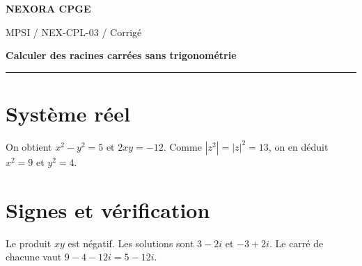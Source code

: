 \documentclass[11pt,a4paper]{article}
\begin{document}
{\small\bfseries\color{nexorablue} NEXORA CPGE}\par
{\small MPSI / NEX-CPL-03 / Corrigé}\par
{\LARGE\bfseries Calculer des racines carrées sans trigonométrie}\par
\vspace{0.25em}\hrule\vspace{0.6em}

\section*{Système réel}
On obtient $x^2-y^2=5$ et $2xy=-12$. Comme $|z^2|=|z|^2=13$, on en déduit $x^2=9$ et $y^2=4$.

\section*{Signes et vérification}
Le produit $xy$ est négatif. Les solutions sont $3-2i$ et $-3+2i$. Le carré de chacune vaut $9-4-12i=5-12i$.
\end{document}
